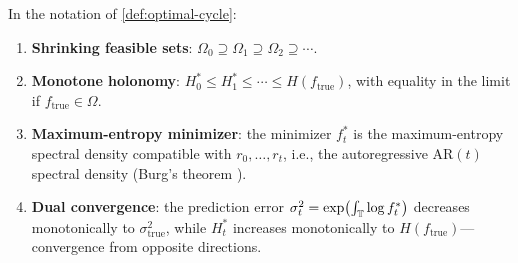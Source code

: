 \begin{proposition}\label{prop:holonomy-monotone}
In the notation of \cref{def:optimal-cycle}:
\begin{enumerate}[label=(\roman*)]
\item \textbf{Shrinking feasible sets}: $\Omega_0 \supseteq \Omega_1 \supseteq \Omega_2 \supseteq \cdots$.
\item \textbf{Monotone holonomy}: $H_0^* \leq H_1^* \leq \cdots \leq H(f_{\mathrm{true}})$, with equality in the limit if $f_{\mathrm{true}} \in \Omega$.
\item \textbf{Maximum-entropy minimizer}: the minimizer $f_t^*$ is the maximum-entropy spectral density compatible with $r_0, \ldots, r_t$, i.e., the autoregressive AR$(t)$ spectral density (Burg's theorem \cite{Burg}).
\item \textbf{Dual convergence}: the prediction error $\sigma_t^2 = \exp\bigl(\int_{\mathbb{T}} \log f_t^*\bigr)$ decreases monotonically to $\sigma_{\mathrm{true}}^2$, while $H_t^*$ increases monotonically to $H(f_{\mathrm{true}})$---convergence from opposite directions.
\end{enumerate}
\end{proposition}

